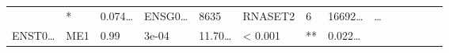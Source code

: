 \documentclass[
]{article}
\begin{document}
\begin{longtable}[]{@{}llllllllllllll@{}}
\begin{minipage}[t]{0.05\columnwidth}
\end{minipage} & \begin{minipage}[t]{0.03\columnwidth}\raggedright
*\strut
\end{minipage} & \begin{minipage}[t]{0.05\columnwidth}\raggedright
0.074\ldots{}\strut
\end{minipage} & \begin{minipage}[t]{0.05\columnwidth}\raggedright
ENSG0\ldots{}\strut
\end{minipage} & \begin{minipage}[t]{0.05\columnwidth}\raggedright
8635\strut
\end{minipage} & \begin{minipage}[t]{0.05\columnwidth}\raggedright
RNASET2\strut
\end{minipage} & \begin{minipage}[t]{0.05\columnwidth}\raggedright
6\strut
\end{minipage} & \begin{minipage}[t]{0.05\columnwidth}\raggedright
16692\ldots{}\strut
\end{minipage} & \begin{minipage}[t]{0.02\columnwidth}\raggedright
\ldots{}\strut
\end{minipage}\tabularnewline
\begin{minipage}[t]{0.05\columnwidth}\raggedright
ENST0\ldots{}\strut
\end{minipage} & \begin{minipage}[t]{0.04\columnwidth}\raggedright
ME1\strut
\end{minipage} & \begin{minipage}[t]{0.04\columnwidth}\raggedright
0.99\strut
\end{minipage} & \begin{minipage}[t]{0.04\columnwidth}\raggedright
3e-04\strut
\end{minipage} & \begin{minipage}[t]{0.05\columnwidth}\raggedright
11.70\ldots{}\strut
\end{minipage} & \begin{minipage}[t]{0.05\columnwidth}\raggedright
\textless{} 0.001\strut
\end{minipage} & \begin{minipage}[t]{0.03\columnwidth}\raggedright
**\strut
\end{minipage} & \begin{minipage}[t]{0.05\columnwidth}\raggedright
0.022\ldots{}\strut

\end{minipage}
\end{longtable}
\end{document}

